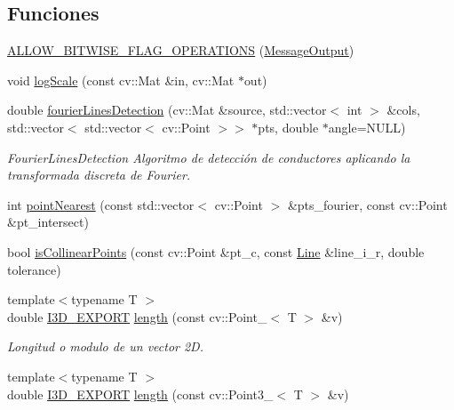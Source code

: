 \subsection*{Funciones}
\begin{DoxyCompactItemize}
\item 
\hyperlink{namespace_i3_d_a67374982e3085e082db07f2941c693a0}{A\+L\+L\+O\+W\+\_\+\+B\+I\+T\+W\+I\+S\+E\+\_\+\+F\+L\+A\+G\+\_\+\+O\+P\+E\+R\+A\+T\+I\+O\+NS} (\hyperlink{namespace_i3_d_a2ccb65ac6e08844c1175a235107fa103}{Message\+Output})
\item 
void \hyperlink{namespace_i3_d_a61642b345ce36927fc6694a81d6540f7}{log\+Scale} (const cv\+::\+Mat \&in, cv\+::\+Mat $\ast$out)
\item 
double \hyperlink{namespace_i3_d_a83df44c7261ddd174a2bcdaaa6935552}{fourier\+Lines\+Detection} (cv\+::\+Mat \&source, std\+::vector$<$ int $>$ \&cols, std\+::vector$<$ std\+::vector$<$ cv\+::\+Point $>$$>$ $\ast$pts, double $\ast$angle=N\+U\+LL)
\begin{DoxyCompactList}\small\item\em Fourier\+Lines\+Detection Algoritmo de detección de conductores aplicando la transformada discreta de Fourier. \end{DoxyCompactList}\item 
int \hyperlink{group___geometric_entities_ga50289ee8c51aeff4b2f4706acbabd932}{point\+Nearest} (const std\+::vector$<$ cv\+::\+Point $>$ \&pts\+\_\+fourier, const cv\+::\+Point \&pt\+\_\+intersect)
\item 
bool \hyperlink{group___geometric_entities_gaa7aa32d175a13ad9ac23bfe016754b1f}{is\+Collinear\+Points} (const cv\+::\+Point \&pt\+\_\+c, const \hyperlink{group___geometric_entities_ga483b43891a1b33d99406fdc397e9a445}{Line} \&line\+\_\+i\+\_\+r, double tolerance)
\item 
{\footnotesize template$<$typename T $>$ }\\double \hyperlink{defs_8h_a83f373279ee1ca96b4003c673142ec1d}{I3\+D\+\_\+\+E\+X\+P\+O\+RT} \hyperlink{group___geometric_entities_ga6cfd96fd34bd41f5b201d69d70daa705}{length} (const cv\+::\+Point\+\_\+$<$ T $>$ \&v)
\begin{DoxyCompactList}\small\item\em Longitud o modulo de un vector 2D. \end{DoxyCompactList}\item 
{\footnotesize template$<$typename T $>$ }\\double \hyperlink{defs_8h_a83f373279ee1ca96b4003c673142ec1d}{I3\+D\+\_\+\+E\+X\+P\+O\+RT} \hyperlink{group___geometric_entities_gadc4e42bc957a28f97e0d45d09d5e1db7}{length} (const cv\+::\+Point3\+\_\+$<$ T $>$ \&v)
$$
\end{DoxyCompactItemize}

